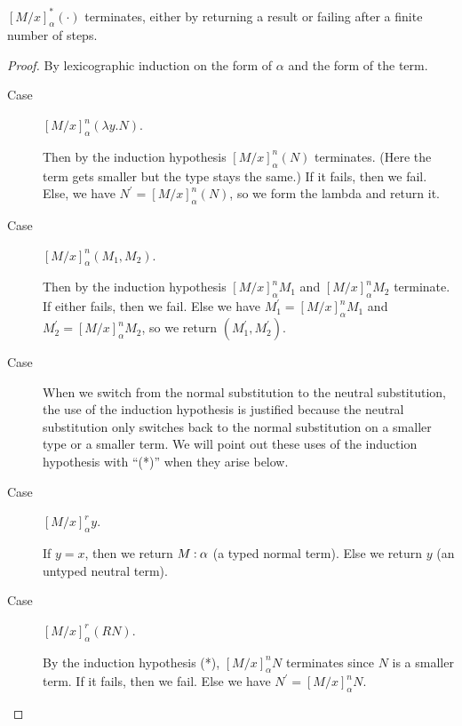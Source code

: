 \documentclass[11pt,letterpaper]{article}
\begin{document}
\begin{enumerate}
    \begin{prop}
      $[M/x]^*_\alpha (\cdot)$ terminates, either by returning a result or
      failing after a finite number of steps.
    \end{prop}

    \begin{proof}
      By lexicographic induction on the form of $\alpha$ and the form of the
      term.

      \begin{description}
        \item[Case]
          $[M/x]^n_\alpha (\lambda y. N)$.

          Then by the induction hypothesis $[M/x]^n_\alpha (N)$ terminates.
          (Here the term gets smaller but the type stays the same.)
          If it fails, then we fail.
          Else, we have $N^\prime = [M/x]^n_\alpha (N)$, so we form the lambda
          and return it.

        \item[Case]
          $[M/x]^n_\alpha (M_1, M_2)$.

          Then by the induction hypothesis
          $[M/x]^n_\alpha M_1$ and $[M/x]^n_\alpha M_2$ terminate.
          If either fails, then we fail.
          Else we have $M_1^\prime = [M/x]^n_\alpha M_1$
          and $M_2^\prime = [M/x]^n_\alpha M_2$,
          so we return $(M_1^\prime, M_2^\prime)$.

        \item[Case]
          When we switch from the normal substitution to the neutral
          substitution, the use of the induction hypothesis is justified
          because the neutral substitution only switches back to the normal
          substitution on a smaller type or a smaller term.
          We will point out these uses of the induction hypothesis with ``(*)''
          when they arise below.

        \item[Case]
          $[M/x]_\alpha^r y$.

          If $y = x$, then we return $M \mathbin{:} \alpha$ (a typed normal term).
          Else we return $y$ (an untyped neutral term).

        \item[Case]
          $[M/x]_\alpha^r (R N)$.

          By the induction hypothesis (*), $[M/x]_\alpha^n N$ terminates since
          $N$ is a smaller term.
          If it fails, then we fail.
          Else we have $N^\prime = [M/x]_\alpha^n N$.


\end{description}
\end{proof}
\end{enumerate}
\end{document}
